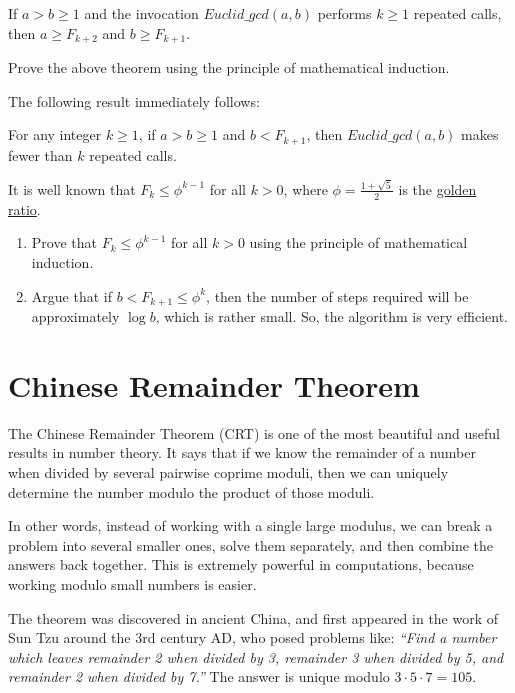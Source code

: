 \begin{theorem}
If $a > b \geq 1$ and the invocation $Euclid\_gcd(a, b)$ performs $k \geq 1$ repeated calls, then $a \geq F_{k+2}$ and
$b \geq F_{k+1}$.
\end{theorem}

\begin{exercise}
Prove the above theorem using the principle of mathematical induction.
\end{exercise}

The following result immediately follows:
\begin{theorem}
For any integer $k \geq 1$, if $a > b \geq 1$ and $b < F_{k+1}$, then  $Euclid\_gcd(a, b)$ makes fewer than
$k$ repeated calls.
\end{theorem}

It is well known that $F_k \leq \phi^{k-1}$ for all $k > 0$, where $\phi = \frac{1+\sqrt{5}}{2}$ is the \href{https://en.wikipedia.org/wiki/Golden_ratio}{golden ratio}. 

\begin{exercise}
\begin{enumerate}
\item Prove that $F_k \leq \phi^{k-1}$ for all $k > 0$ using the principle of mathematical induction.
\item Argue that if  $b < F_{k+1} \leq \phi^k$, then the number of steps required will be approximately $\log{b}$, which is rather small. So, the algorithm is very efficient.
\end{enumerate}
\end{exercise}

\section{Chinese Remainder Theorem}


The Chinese Remainder Theorem (CRT) is one of the most beautiful and useful results in number theory. 
It says that if we know the remainder of a number when divided by several pairwise coprime moduli, 
then we can uniquely determine the number modulo the product of those moduli.

In other words, instead of working with a single large modulus, we can break a problem into 
several smaller ones, solve them separately, and then combine the answers back together. 
This is extremely powerful in computations, because working modulo small numbers is easier.

\medskip
\noindent
The theorem was discovered in ancient China, and first appeared in the work of 
Sun Tzu around the 3rd century AD, who posed problems like:
\emph{``Find a number which leaves remainder 2 when divided by 3, remainder 3 when divided by 5, and remainder 2 when divided by 7.''}  
The answer is unique modulo $3\cdot 5 \cdot 7 = 105$.

